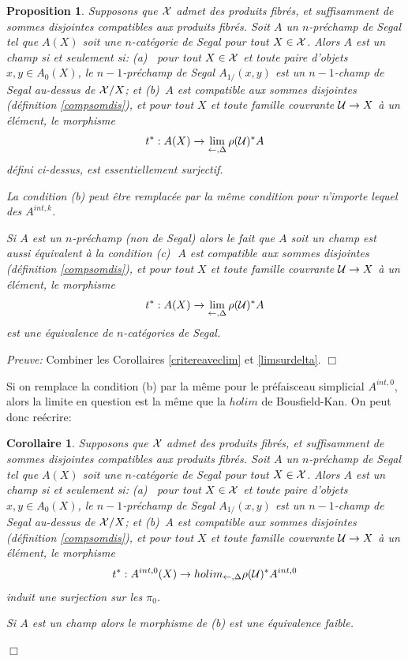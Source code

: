 \documentclass[12pt]{article}
\newcommand{\eop}{\hfill $\Box$\vspace{.1in}}
\newtheorem{proposition}[lemma]{Proposition}
\newtheorem{corollaire}[lemma]{Corollaire}
\newcommand{\Uu}{{\cal U}}
\newcommand{\Xx}{{\cal X}}
\begin{document}
\begin{proposition}
\label{critere7}
Supposons que $\Xx$ admet des produits fibr\'es, et suffisamment de
\linebreak
sommes disjointes compatibles aux produits fibr\'es. Soit $A$ un
$n$-pr\'echamp  de Segal
tel que $A(X)$ soit une $n$-cat\'egorie de Segal pour tout $X\in \Xx$.
Alors $A$ est un champ si et seulement si:
\newline
(a) \,  pour tout $X\in \Xx$ et toute paire d'objets $x,y\in A_0(X)$, le
$n-1$-pr\'echamp de Segal $A_{1/}(x,y)$ est un $n-1$-champ de Segal au-dessus de
$\Xx /X$;
et
\newline
(b)\, $A$ est compatible aux sommes disjointes (d\'efinition
\ref{compsomdis}), et pour tout $X$ et toute famille couvrante $\Uu \rightarrow
X$ \`a un \'el\'ement, le morphisme
$$
t^{\ast} : A(X) \rightarrow \lim _{\leftarrow , \Delta} \rho (\Uu )^{\ast }A
$$
d\'efini ci-dessus, est essentiellement surjectif.

La condition (b) peut \^etre
remplac\'ee par la m\^eme condition pour n'importe lequel des
$A^{int, k}$.

Si $A$ est un $n$-pr\'echamp (non de Segal) alors
le fait que  $A$ soit un champ est aussi \'equivalent \`a la condition
\newline
(c)\,\,  $A$ est compatible aux sommes disjointes (d\'efinition
\ref{compsomdis}), et pour tout $X$ et toute famille couvrante $\Uu
\rightarrow
X$ \`a un \'el\'ement, le
morphisme
$$
t^{\ast} : A(X) \rightarrow \lim _{\leftarrow , \Delta} \rho (\Uu )^{\ast }A
$$
est une \'equivalence de $n$-cat\'egories de Segal.
\end{proposition}
{\em Preuve:}
Combiner les Corollaires \ref{critereaveclim} et \ref{limsurdelta}.
\eop

Si on remplace la condition (b) par la m\^eme pour le pr\'efaisceau simplicial
$A^{int, 0}$, alors la limite
en question est la m\^eme que la $holim$ de Bousfield-Kan. On
peut donc re\'ecrire:
\begin{corollaire}
Supposons que $\Xx$ admet des produits fibr\'es, et suffisamment de sommes
disjointes compatibles aux produits fibr\'es. Soit $A$ un $n$-pr\'echamp de
Segal tel que $A(X)$ soit une $n$-cat\'egorie
de Segal pour tout $X\in \Xx$. Alors $A$ est un champ si et seulement si:
\newline
(a) \,  pour tout $X\in \Xx$ et toute paire d'objets $x,y\in A_0(X)$, le
$n-1$-pr\'echamp de Segal $A_{1/}(x,y)$ est un $n-1$-champ de Segal au-dessus de
$\Xx /X$; et
\newline
(b)\, $A$ est compatible aux sommes disjointes (d\'efinition
\ref{compsomdis}), et pour tout $X$ et toute famille couvrante $\Uu \rightarrow
X$ \`a un \'el\'ement, le morphisme
$$
t^{\ast} : A^{int, 0}(X) \rightarrow holim _{\leftarrow , \Delta} \rho
(\Uu )^{\ast }A^{int ,0}
$$
induit une surjection sur les $\pi _0$.

Si $A$ est un champ alors le morphisme de (b) est une \'equivalence faible.
\end{corollaire}
\eop
\end{document}
